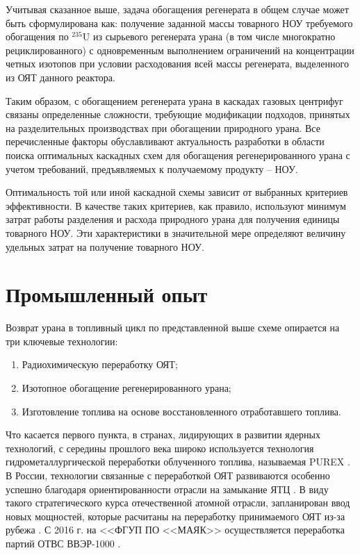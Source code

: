 Учитывая сказанное выше, задача обогащения регенерата в общем случае может быть сформулирована как: получение заданной массы товарного НОУ требуемого обогащения по $^{235}$U из сырьевого регенерата урана (в том числе многократно рециклированного) с одновременным выполнением ограничений на концентрации четных изотопов при условии расходования всей массы регенерата, выделенного из ОЯТ данного реактора.

Таким образом, с обогащением регенерата урана в каскадах газовых центрифуг связаны определенные сложности, требующие модификации подходов, принятых на разделительных производствах при обогащении природного урана. Все перечисленные факторы обуславливают актуальность разработки в области поиска оптимальных каскадных схем для обогащения регенерированного урана с учетом требований, предъявляемых к получаемому продукту -- НОУ.

Оптимальность той или иной каскадной схемы зависит от выбранных критериев эффективности. В качестве таких критериев, как правило, используют минимум затрат работы разделения и расхода природного урана для получения единицы товарного НОУ. Эти характеристики в значительной мере определяют величину удельных затрат на получение товарного НОУ.


\section{Промышленный опыт}\label{sec:ch1/sec1}

Возврат урана в топливный цикл по представленной выше схеме опирается на три ключевые технологии:
\begin{enumerate}
  \item Радиохимическую переработку ОЯТ;
  \item Изотопное обогащение регенерированного урана;
  \item Изготовление топлива на основе восстановленного отработавшего топлива.
\end{enumerate}

Что касается первого пункта, в странах, лидирующих в развитии ядерных технологий, с середины прошлого века широко используется технология гидрометаллургической переработки облученного топлива, называемая PUREX \cite{selvaduraySurveyNuclearFuel1979}. В России, технологии связанные с переработкой ОЯТ развиваются особенно успешно благодаря ориентированности отрасли на замыкание ЯТЦ \cite{balihinSostoyaniiPerspektivahRazvitiya2018, efimenkoProblemyPerspektivyRazvitiya2017}. В виду такого стратегического курса отечественной атомной отрасли, запланирован ввод новых мощностей, которые расчитаны на переработку принимаемого ОЯТ из-за рубежа \cite{050519L3942005}. С 2016 г. на <<ФГУП ПО <<МАЯК>> осуществляется переработка партий ОТВС ВВЭР-1000 \cite{PyatyyNacionalnyyDoklad}.

